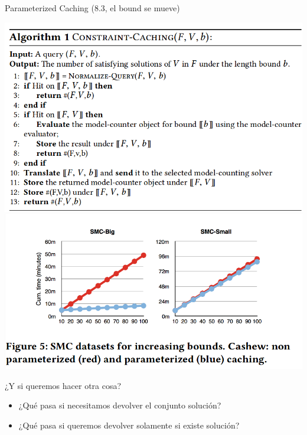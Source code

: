 \documentclass[10pt]{beamer}
\begin{document}

\begin{frame}{Parameterized Caching (8.3, el bound se mueve)}

\includegraphics[scale=0.35]{alg1.png}\\
\includegraphics[scale=0.27]{figure5.png}




\end{frame}

\begin{frame}{¿Y si queremos hacer otra cosa?}
\begin{itemize}
	\item ¿Qué pasa si necesitamos devolver el conjunto solución?
	\item ¿Qué pasa si queremos devolver solamente si existe solución?
\end{itemize}
\end{frame}
\end{document}
